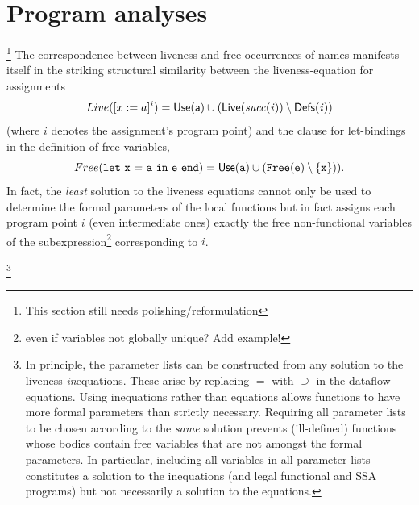 {\tiny

\section{Program analyses}
\label{section:Part1:Semantics:ProgramAnalyses}
\footnote{This section still needs polishing/reformulation}
The correspondence between liveness and free occurrences of names
manifests itself in the striking structural similarity between the
liveness-equation for assignments $$\sc{Live}([x:=a]^i) =
\mathsf{Use}(a) \cup (\sc{Live}(\mathit{succ}(i)) \setminus \mathsf{Defs}(i))$$ 
(where $i$ denotes the assignment's program point) and the clause for
let-bindings
in the definition of free variables,
$$\sc{Free}(\mathtt{let}\ {x}\ \mathtt{=}\ {a}\ \mathtt{in}\ {e}\ \mathtt{end}) = \mathsf{Use}(a) \cup (\sc{Free}(e) \setminus
\{x\})).
$$ In fact, the \emph{least} solution to the liveness equations cannot
only be used to determine the formal parameters of the local functions
but in fact assigns each program point $i$ (even intermediate ones)
exactly the free non-functional variables of the
subexpression\footnote{even if variables not globally unique? Add
example!}  corresponding to $i$.

\footnote{In principle, the parameter lists can be
constructed from any solution to the
liveness-\emph{in}equations. These arise by replacing $=$ with
$\supseteq$ in the dataflow equations. Using inequations rather than
equations allows functions to have more formal parameters than
strictly necessary. Requiring all parameter lists to be chosen
according to the
\emph{same} solution prevents (ill-defined) functions whose bodies contain free
variables that are not amongst the formal parameters.  In particular,
including all variables in all parameter lists constitutes a solution
to the inequations (and legal functional and SSA programs) but not
necessarily a solution to the equations.}

}
